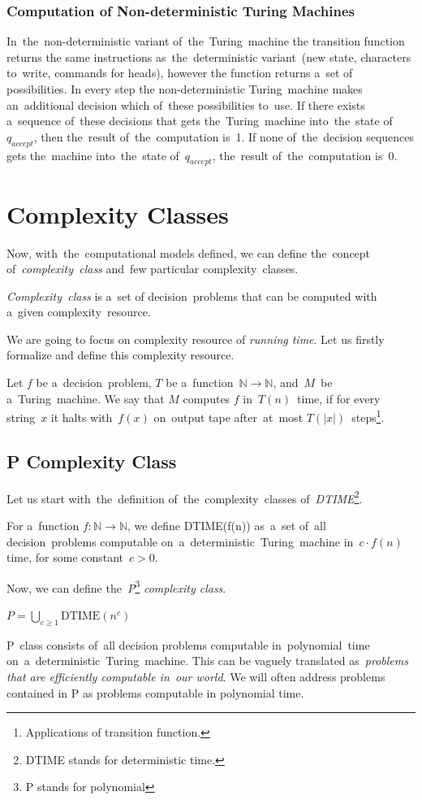 \subsubsection{Computation of Non-deterministic Turing Machines}
In~the~non-deterministic variant of~the~Turing~machine the transition function returns the same instructions as~the~deterministic variant~(new state, characters to~write, commands for heads), however the function returns a~set of possibilities. In every step the non-deterministic Turing~machine makes an~additional decision which of~these possibilities to~use. If there exists a~sequence of~these decisions that gets the~Turing~machine into~the~state of~$q_{accept}$, then the~result of~the~computation is~1. If none of~the~decision sequences gets the~machine into~the~state of~$q_{accept}$, the~result of~the~computation is~0.

\section{Complexity Classes}
\label{sec:Complexity classes}
Now, with~the~computational models defined, we can define the~concept of~\textit{complexity~class} and~few particular complexity~classes.
\begin{definition}
    \emph{Complexity~class} is a~set of decision~problems that can be computed with a~given complexity~resource.
\end{definition}
We are going to focus on complexity resource of \textit{running time}. Let us firstly formalize and define this complexity resource.
\begin{definition}
    Let $f$ be a~decision~problem, $T$ be a~function~${\mathbb{N} \rightarrow \mathbb{N}}$, and~$M$~be a~Turing~machine. We say that $M$ computes $f$ in~$T(n)$~time, if for every string~$x$ it halts with~$f(x)$ on~output tape after~at~most $T(|x|)$~steps\footnote{Applications of transition function.}. 
\end{definition}
\pagebreak
\subsection{P Complexity Class}
Let us start with~the~definition of~the~complexity~classes of~\textit{DTIME}\footnote{DTIME stands for deterministic time.}.
\begin{definition}[DTIME]
    For a~function ${f : \mathbb{N} \rightarrow \mathbb{N}}$, we define DTIME(f(n)) as~a~set of~all decision~problems computable on~a~deterministic~Turing~machine in~$c \cdot f(n)$ time, for some constant~${c > 0}$.
\end{definition}
Now, we can define the~\textit{P}\footnote{P stands for polynomial} \textit{complexity class}.
\begin{definition}
    $P = \bigcup_{c \geq 1}\text{DTIME}(n^c)$
\end{definition}
P~class consists of~all decision problems computable in~polynomial~time on~a~deterministic~Turing~machine. This can be vaguely translated as~\textit{problems that are efficiently computable in~our world}. We will often address problems contained in P as problems computable in polynomial time.
